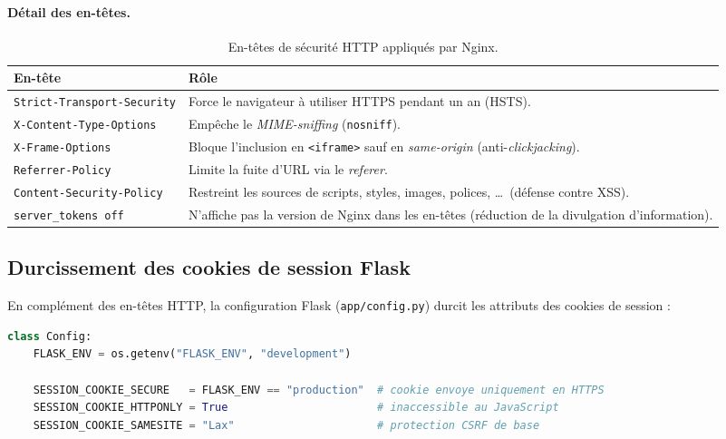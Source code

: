 \paragraph{Détail des en-têtes.}

\begin{table}[H]
\centering
\caption{En-têtes de sécurité HTTP appliqués par Nginx.}
\begin{tabular}{P{4.5cm} P{9cm}}
\toprule
\textbf{En-tête} & \textbf{Rôle} \\
\midrule
\texttt{Strict-Transport-Security} & Force le navigateur à utiliser HTTPS pendant un an (HSTS). \\
\texttt{X-Content-Type-Options}    & Empêche le \textit{MIME-sniffing} (\texttt{nosniff}). \\
\texttt{X-Frame-Options}           & Bloque l'inclusion en \texttt{<iframe>} sauf en \emph{same-origin} (anti-\textit{clickjacking}). \\
\texttt{Referrer-Policy}           & Limite la fuite d'URL via le \emph{referer}. \\
\texttt{Content-Security-Policy}   & Restreint les sources de scripts, styles, images, polices, \ldots\ (défense contre XSS). \\
\texttt{server\_tokens off}        & N'affiche pas la version de Nginx dans les en-têtes (réduction de la divulgation d'information). \\
\bottomrule
\end{tabular}
\end{table}

\subsection{Durcissement des cookies de session Flask}

En complément des en-têtes HTTP, la configuration Flask
(\texttt{app/config.py}) durcit les attributs des cookies de session :

\begin{lstlisting}[language=Python, caption={Extrait de \texttt{config.py} --- cookies de session.}]
class Config:
    FLASK_ENV = os.getenv("FLASK_ENV", "development")

    SESSION_COOKIE_SECURE   = FLASK_ENV == "production"  # cookie envoye uniquement en HTTPS
    SESSION_COOKIE_HTTPONLY = True                       # inaccessible au JavaScript
    SESSION_COOKIE_SAMESITE = "Lax"                      # protection CSRF de base
\end{lstlisting}

